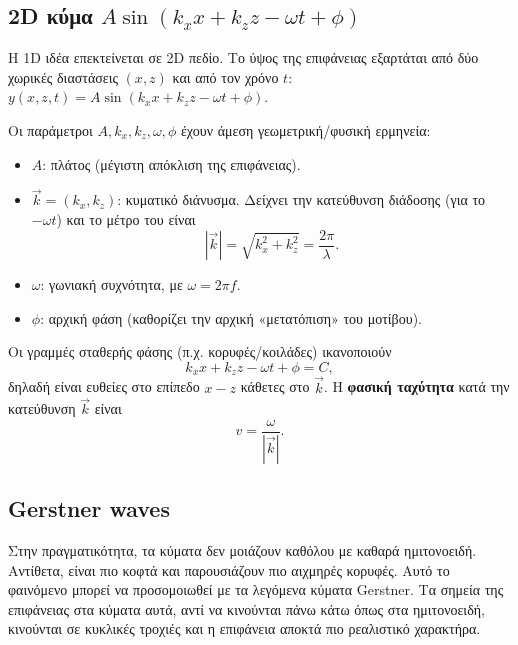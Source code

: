 \documentclass[
  a4paper,
  11pt,
]{article}
\providecommand{\tightlist}{%
  \setlength{\itemsep}{0pt}\setlength{\parskip}{0pt}}
\begin{document}
\subsection{\texorpdfstring{2D κύμα
\(A\sin(k_x x + k_z z - \omega t + \phi)\)}{2D κύμα A\textbackslash sin(k\_x x + k\_z z - \textbackslash omega t + \textbackslash phi)}}\label{d-ux3baux3cdux3bcux3b1-asink_x-x-k_z-z---omega-t-phi}

Η 1D ιδέα επεκτείνεται σε 2D πεδίο. Το ύψος της επιφάνειας εξαρτάται από
δύο χωρικές διαστάσεις \((x,z)\) και από τον χρόνο \(t\):
\(y(x,z,t)=A\sin(k_x x + k_z z - \omega t + \phi)\).

Οι παράμετροι \(A, k_x, k_z, \omega, \phi\) έχουν άμεση
γεωμετρική/φυσική ερμηνεία:

\begin{itemize}
\tightlist
\item
  \(A\): πλάτος (μέγιστη απόκλιση της επιφάνειας).
\item
  \(\vec{k}=(k_x,k_z)\): κυματικό διάνυσμα. Δείχνει την κατεύθυνση
  διάδοσης (για το \(-\omega t\)) και το μέτρο του είναι \[
  |\vec{k}|=\sqrt{k_x^2+k_z^2}=\frac{2\pi}{\lambda}.
  \]
\item
  \(\omega\): γωνιακή συχνότητα, με \(\omega=2\pi f\).
\item
  \(\phi\): αρχική φάση (καθορίζει την αρχική «μετατόπιση» του μοτίβου).
\end{itemize}

Οι γραμμές σταθερής φάσης (π.χ. κορυφές/κοιλάδες) ικανοποιούν \[
k_x x + k_z z - \omega t + \phi = C,
\] δηλαδή είναι ευθείες στο επίπεδο \(x\!-\!z\) κάθετες στο \(\vec{k}\).
Η \textbf{φασική ταχύτητα} κατά την κατεύθυνση \(\vec{k}\) είναι \[
v=\frac{\omega}{|\vec{k}|}.
\]

\subsection{Gerstner waves}\label{gerstner-waves}

Στην πραγματικότητα, τα κύματα δεν μοιάζουν καθόλου με καθαρά
ημιτονοειδή. Αντίθετα, είναι πιο κοφτά και παρουσιάζουν πιο αιχμηρές
κορυφές. Αυτό το φαινόμενο μπορεί να προσομοιωθεί με τα λεγόμενα κύματα
Gerstner. Τα σημεία της επιφάνειας στα κύματα αυτά, αντί να κινούνται
πάνω κάτω όπως στα ημιτονοειδή, κινούνται σε κυκλικές τροχιές και η
επιφάνεια αποκτά πιο ρεαλιστικό χαρακτήρα.
\end{document}
